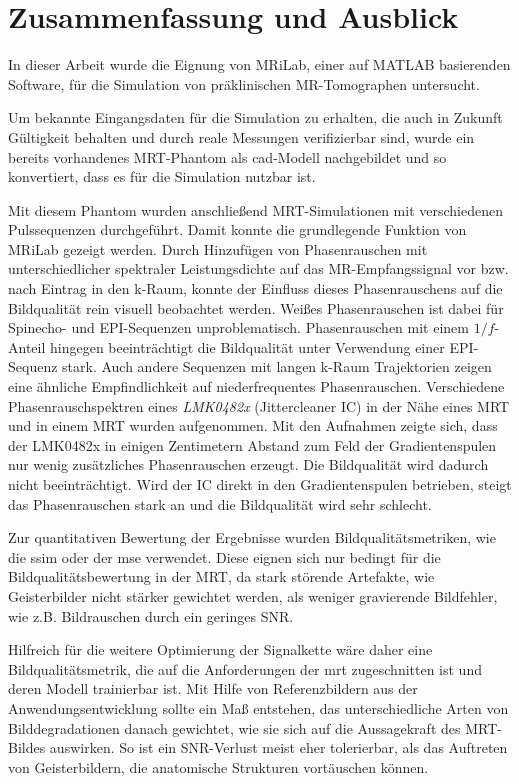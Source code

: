 \chapter{Zusammenfassung und Ausblick}
In dieser Arbeit wurde die Eignung von MRiLab, einer auf MATLAB basierenden Software, für die Simulation von präklinischen MR-Tomographen untersucht.

Um bekannte Eingangsdaten für die Simulation zu erhalten, die auch in Zukunft Gültigkeit behalten und durch reale Messungen verifizierbar sind, wurde ein bereits vorhandenes MRT-Phantom als \gls{cad}-Modell nachgebildet und so konvertiert, dass es für die Simulation nutzbar ist.

Mit diesem Phantom wurden anschließend MRT-Simulationen mit verschiedenen Pulssequenzen durchgeführt. Damit konnte die grundlegende Funktion von MRiLab gezeigt werden. Durch Hinzufügen von Phasen\-rauschen mit unterschiedlicher spektraler Leistungsdichte auf das MR-\-Empfangs\-signal vor bzw. nach Eintrag in den k-Raum, konnte der Einfluss dieses Phasenrauschens auf die Bildqualität rein visuell beobachtet werden. Weißes Phasenrauschen ist dabei für Spinecho- und EPI-Sequenzen unproblematisch. Phasenrauschen mit einem $1/f$-Anteil hingegen beeinträchtigt die Bildqualität unter Verwendung einer EPI-Sequenz stark. Auch andere Sequenzen mit langen k-Raum Trajektorien zeigen eine ähnliche Empfindlichkeit auf niederfrequentes Phasenrauschen. Verschiedene Phasenrauschspektren eines \textit{LMK0482x} (Jittercleaner IC) in der Nähe eines MRT und in einem MRT wurden aufgenommen. Mit den Aufnahmen zeigte sich, dass der LMK0482x in einigen Zentimetern Abstand zum Feld der Gradientenspulen nur wenig zusätzliches Phasenrauschen erzeugt. Die Bildqualität wird dadurch nicht beeinträchtigt. Wird der IC direkt in den Gradientenspulen betrieben, steigt das Phasenrauschen stark an und die Bildqualität wird sehr schlecht.

Zur quantitativen Bewertung der Ergebnisse wurden Bildqualitätsmetriken, wie die \gls{ssim} oder der \gls{mse} verwendet. Diese eignen sich nur bedingt für die Bildqualitätsbewertung in der MRT, da stark störende Artefakte, wie Geisterbilder nicht stärker gewichtet werden, als weniger gravierende Bildfehler, wie z.B. Bildrauschen durch ein geringes SNR.

Hilfreich für die weitere Optimierung der Signalkette wäre daher eine Bildqualitätsmetrik, die auf die Anforderungen der \gls{mrt} zugeschnitten ist und deren Modell trainierbar ist. Mit Hilfe von Referenzbildern aus der Anwendungsentwicklung sollte ein Maß entstehen, das unterschiedliche Arten von Bilddegradationen danach gewichtet, wie sie sich auf die Aussagekraft des MRT-Bildes auswirken. So ist ein SNR-Verlust meist eher tolerierbar, als das Auftreten von Geisterbildern, die anatomische Strukturen vortäuschen können. 